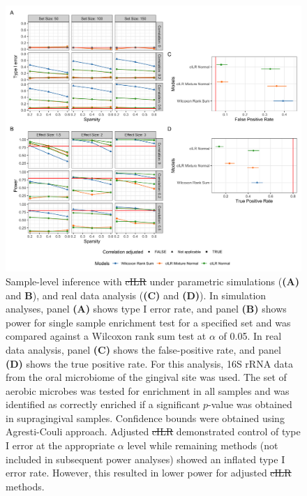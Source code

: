 \documentclass[10pt,letterpaper]{article}
\providecommand{\DIFaddtex}[1]{{\protect\color{blue}\uwave{#1}}} %
\providecommand{\DIFdeltex}[1]{{\protect\color{red}\sout{#1}}}                      %
\providecommand{\DIFaddFL}[1]{\DIFadd{#1}} %
\providecommand{\DIFdelFL}[1]{\DIFdel{#1}} %
\providecommand{\DIFaddbeginFL}{} %
\providecommand{\DIFaddendFL}{} %
\providecommand{\DIFdelbeginFL}{} %
\providecommand{\DIFdelendFL}{} %
\providecommand{\DIFadd}[1]{\texorpdfstring{\DIFaddtex{#1}}{#1}} %
\providecommand{\DIFdel}[1]{\texorpdfstring{\DIFdeltex{#1}}{}} %
\newcommand{\DIFscaledelfig}{0.5}
\newlength{\DIFdelgraphicswidth} %
\newlength{\DIFdelgraphicsheight} %
\newcommand{\DIFaddincludegraphics}[2][]{{\color{blue}\fbox{\DIFOincludegraphics[#1]{#2}}}} %
\newcommand{\DIFdelincludegraphics}[2][]{%
\sbox{\DIFdelgraphicsbox}{\DIFOincludegraphics[#1]{#2}}%
\settoboxwidth{\DIFdelgraphicswidth}{\DIFdelgraphicsbox} %
\settoboxtotalheight{\DIFdelgraphicsheight}{\DIFdelgraphicsbox} %
\scalebox{\DIFscaledelfig}{%
\parbox[b]{\DIFdelgraphicswidth}{\usebox{\DIFdelgraphicsbox}\\[-\baselineskip] \rule{\DIFdelgraphicswidth}{0em}}\llap{\resizebox{\DIFdelgraphicswidth}{\DIFdelgraphicsheight}{%
\setlength{\unitlength}{\DIFdelgraphicswidth}%
\begin{picture}(1,1)%
\thicklines\linethickness{2pt} %
{\color[rgb]{1,0,0}\put(0,0){\framebox(1,1){}}}%
{\color[rgb]{1,0,0}\put(0,0){\line( 1,1){1}}}%
{\color[rgb]{1,0,0}\put(0,1){\line(1,-1){1}}}%
\end{picture}%
}\hspace*{3pt}}} %
} %
\DeclareRobustCommand{\DIFaddbeginFL}{\DIFOaddbeginFL \let\includegraphics\DIFaddincludegraphics} %
\DeclareRobustCommand{\DIFaddendFL}{\DIFOaddendFL \let\includegraphics\DIFOincludegraphics} %
\DeclareRobustCommand{\DIFdelbeginFL}{\DIFOdelbeginFL \let\includegraphics\DIFdelincludegraphics} %
\DeclareRobustCommand{\DIFdelendFL}{\DIFOaddendFL \let\includegraphics\DIFOincludegraphics} %
\begin{document}
\begin{figure}[!h]
    \centering
    \includegraphics[width=\textwidth]{figures/sim_data_ss_hypo.png}
    \caption{Sample-level inference with \DIFdelbeginFL \DIFdelFL{cILR }\DIFdelendFL \DIFaddbeginFL \DIFaddFL{CBEA }\DIFaddendFL under parametric simulations (\textbf{(A)} and \textbf{B}), and real data analysis (\textbf{(C)} and \textbf{(D)}). In simulation analyses, panel \textbf{(A)} shows type I error rate, and panel \textbf{(B)} shows power for single sample enrichment test for a specified set and was compared against a Wilcoxon rank sum test at $\alpha$ of 0.05. In real data analysis, panel \textbf{(C)} shows the false-positive rate, and panel \textbf{(D)} shows the true positive rate. For this analysis, 16S rRNA data from the oral microbiome of the gingival site was used. The set of aerobic microbes was tested for enrichment in all samples and was identified as correctly enriched if a significant $p$-value was obtained in supragingival samples. Confidence bounds were obtained using Agresti-Couli \cite{agresti1998} approach. Adjusted \DIFdelbeginFL \DIFdelFL{cILR }\DIFdelendFL \DIFaddbeginFL \DIFaddFL{CBEA }\DIFaddendFL demonstrated control of type I error at the appropriate $\alpha$ level while remaining methods (not included in subsequent power analyses) showed an inflated type I error rate. However, this resulted in lower power for adjusted \DIFdelbeginFL \DIFdelFL{cILR }\DIFdelendFL \DIFaddbeginFL \DIFaddFL{CBEA }\DIFaddendFL methods.}
    \label{fig:2}
\end{figure}
\end{document}
